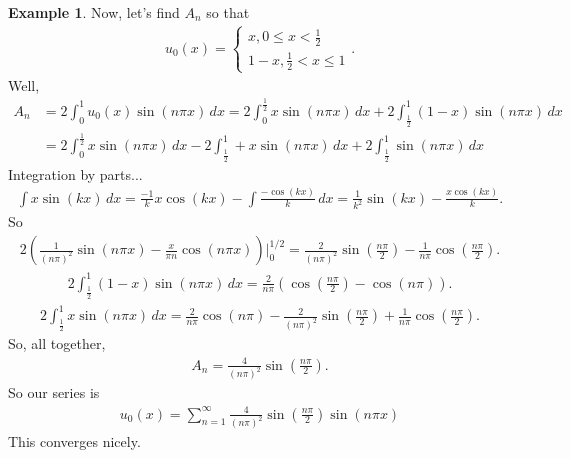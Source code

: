 \documentclass{article}
\theoremstyle{definition}
\newtheorem{exmp}{Example}[section]
\begin{document}
\begin{exmp}
	Now, let's find $A_n$ so that 
	\begin{align*}
	u_0(x) = \begin{cases}
	x, 0\leq x < \frac{1}{2}\\
	1-x, \frac{1}{2} < x \leq 1
	\end{cases}.
	\end{align*}
	Well,
	\begin{align*}
	A_n &= 2\int_{0}^1 u_0(x)\sin(n\pi x)\,dx = 2\int_{0}^\frac{1}{2} x\sin(n\pi x)\,dx + 2\int_{\frac{1}{2}}^1 (1-x)\sin(n\pi x)\,dx\\
	&= 2\int_{0}^\frac{1}{2} x\sin(n\pi x)\,dx - 2\int_\frac{1}{2}^1 +  x\sin(n\pi x)\,dx + 2\int_{\frac{1}{2}}^1 \sin(n\pi x)\,dx
	\end{align*}
	Integration by parts...
	\begin{align*}
	\int x\sin(kx)\,dx = \frac{-1}{k}x\cos(kx) - \int \frac{-\cos(kx)}{k}\,dx = \frac{1}{k^2}\sin(kx) - \frac{x\cos(kx)}{k}.
	\end{align*}
	So
	\begin{align*}
	2\left( \frac{1}{(n\pi)^2}\sin(n\pi x) - \frac{x}{\pi n}\cos(n\pi x)
	 \right)\bigg\vert^{1/2}_0
	 = \frac{2}{(n\pi)^2}\sin\left( \frac{n\pi}{2}\right)  - \frac{1}{n\pi}\cos\left( \frac{n\pi}{2}\right).
	\end{align*}
	\begin{align*}
	2\int_{\frac{1}{2}}^1 (1-x)\sin(n\pi x)\,dx = 
	\frac{2}{n\pi}\left( \cos\left(\frac{n\pi}{2} \right)  - \cos(n\pi)\right).
	\end{align*}
	\begin{align*}
	2\int_\frac{1}{2}^1 x\sin(n\pi x)\,dx = \frac{2}{n\pi}\cos(n\pi) - \frac{2}{(n\pi)^2}\sin\left( \frac{n\pi}{2} \right) + \frac{1}{n\pi}\cos\left(\frac{n\pi}{2} \right).
	\end{align*}
	So, all together,
	\begin{align*}
	A_n = \frac{4}{(n\pi)^2}\sin\left( \frac{n\pi}{2}\right).
	\end{align*}
	So our series is
	\begin{align*}
	u_0(x) = \sum_{n=1}^\infty \frac{4}{(n\pi)^2}\sin\left( \frac{n\pi}{2}\right) \sin(n\pi x)
	\end{align*}
	This converges nicely. 
\end{exmp}
\end{document}
